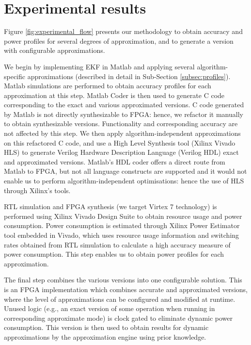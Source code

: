 \section{Experimental results}\label{experiments}

Figure \ref{fig:experimental_flow} presents our methodology to obtain accuracy and power profiles for several degrees of approximation, and to generate a version with configurable approximations. 
\par We begin by implementing EKF in Matlab and applying several algorithm-specific approximations (described in detail in Sub-Section \ref{subsec:profiles}). Matlab simulations are performed to obtain accuracy profiles for each approximation at this step. Matlab Coder is then used to generate C code corresponding to the exact and various approximated versions. C code generated by Matlab is not directly synthesizable to FPGA: hence, we refactor it manually to obtain synthesizable versions. Functionality and corresponding accuracy are not affected by this step. We then apply algorithm-independent approximations on this refactored C code, and use a High Level Synthesis tool (Xilinx Vivado HLS) to generate Verilog Hardware Description Language (Verilog HDL) exact and approximated versions. Matlab's HDL coder offers a direct route from Matlab to FPGA, but not all language constructs are supported and it would not enable us to perform algorithm-independent optimisations: hence the use of HLS through Xilinx's tools.
\par RTL simulation and FPGA synthesis (we target Virtex 7 technology) is performed using Xilinx Vivado Design Suite to obtain resource usage and power consumption. Power consumption is estimated through Xilinx Power Estimator tool embedded in Vivado, which uses resource usage information and switching rates obtained from RTL simulation to calculate a high accuracy measure of power consumption. This step enables us to obtain power profiles for each approximation.
\par The final step combines the various versions into one configurable solution. This is an FPGA implementation which combines accurate and approximated versions, where the level of approximations can be configured and modified at runtime. Unused logic (e.g., an exact version of some operation when running in corresponding approximate mode) is clock gated to eliminate dynamic power consumption. This version is then used to obtain results for dynamic approximations by the approximation engine using prior knowledge.  

